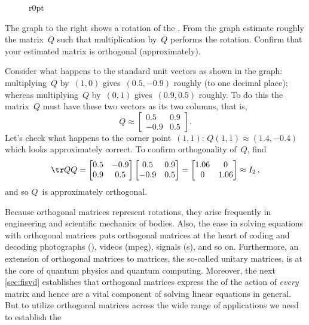 \begin{wrapfigure}r{0pt}
\def\unithousesize{footnotesize,grid} 
\end{wrapfigure}
\begin{example} \label{eg:introt}
The graph to the right shows a rotation of the . 
From the graph estimate roughly the matrix~\(Q\) such that multiplication by~\(Q\) performs the rotation. 
Confirm that your estimated matrix is orthogonal (approximately).

\begin{solution} 
Consider what happens to the standard unit vectors as shown in the graph:  multiplying~\(Q\) by~\((1,0)\) gives~\((0.5,-0.9)\) roughly (to one decimal place); whereas multiplying~\(Q\) by~\((0,1)\) gives~\((0.9,0.5)\) roughly.
To do this the matrix~\(Q\) must have these two vectors as its two columns, that is,
\begin{equation*}
Q\approx\begin{bmatrix} 0.5&0.9\\-0.9&0.5 \end{bmatrix}.
\end{equation*}
Let's check what happens to the corner point~\((1,1)\): \(Q(1,1)\approx (1.4,-0.4)\) which looks approximately correct.
To confirm orthogonality of~\(Q\), find
\begin{equation*}
\tr QQ=\begin{bmatrix} 0.5&-0.9\\0.9&0.5 \end{bmatrix}
\begin{bmatrix} 0.5&0.9\\-0.9&0.5 \end{bmatrix}
=\begin{bmatrix} 1.06&0\\0&1.06 \end{bmatrix}\approx I_2\,,
\end{equation*}
and so \(Q\)~is approximately orthogonal.
\end{solution}
\end{example}


Because orthogonal matrices represent rotations, they arise frequently in engineering and scientific mechanics of bodies.
Also, the ease in solving equations with orthogonal matrices puts orthogonal matrices at the heart of coding and decoding photographs (), videos (mpeg), signals (s), and so on.
Furthermore, an extension of orthogonal matrices to  matrices, the so-called unitary matrices, is at the core of quantum physics and quantum computing.
Moreover, the next \cref{sec:fisvd} establishes that orthogonal matrices express the  of the action of \emph{every} matrix and hence are a vital component of solving linear equations in general.
But to utilize orthogonal matrices across the wide range of applications we need to establish the 




